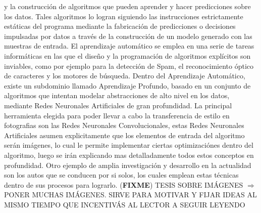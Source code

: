 \documentclass[a4paper,11pt,spanish]{book}
\newcommand*{\FIXME}[1]{{(\textbf{FIXME}) {#1}}}
\begin{document}
    y la construcción de algoritmos que pueden aprender y hacer predicciones sobre los datos. Tales algoritmos lo logran siguiendo las instrucciones estrictamente estáticas del programa 
    mediante la fabricación de predicciones o decisiones impulsadas por datos​ a través de la construcción de un modelo generado con las muestras de entrada. El aprendizaje automático 
    se emplea en una serie de tareas informáticas en las que el diseño y la programación de algoritmos explícitos son inviables, como por ejemplo para la detección de Spam, el reconocimiento
    óptico de caracteres y los motores de búsqueda.
    Dentro del Aprendizaje Automático, existe un subdominio llamado Aprendizaje Profundo, basado en un conjunto de algoritmos que intentan modelar abstracciones de alto nivel en los datos,
    mediante Redes Neuronales Artificiales de gran profundidad.
    La principal herramienta elegida para poder llevar a cabo la transferencia de estilo en fotografias son las Redes Neuronales Convolucionales, estas Redes Neuronales Artificiales asumen 
    explicitamente que los elementos de  entrada del algoritmo serán imágenes, lo cual le permite implementar ciertas optimizaciónes dentro del algoritmo, luego
    se irán explicando mas detalladamente todos estos conceptos en profundidad.
    Otro ejemplo de amplia investigación y desarrollo en la actualidad son los autos que se conducen por si solos, los cuales emplean estas técnicas dentro de sus procesos para lograrlo.
  \FIXME{TESIS SOBRE IMÁGENES $\Rightarrow$ PONER MUCHAS IMÁGENES. SIRVE PARA MOTIVAR Y FIJAR IDEAS AL MISMO TIEMPO QUE INCENTIVÁS AL LECTOR A SEGUIR LEYENDO}
  
\end{document}
